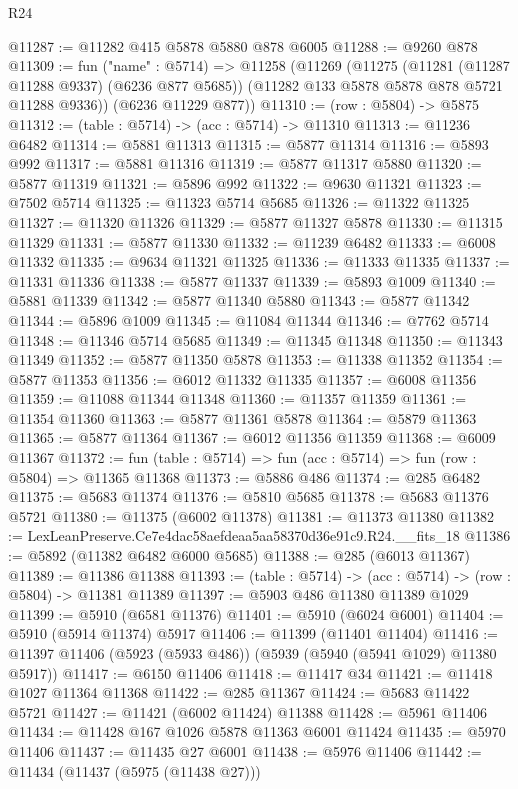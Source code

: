 \begin{lexlean}{R24}
\begin{coremodule}
@11287 := @11282 @415 @5878 @5880 @878 @6005
@11288 := @9260 @878
@11309 := fun ("name" : @5714) =>
  @11258
    (@11269
      (@11275
        (@11281 (@11287 @11288 @9337) (@6236 @877 @5685))
        (@11282 @133 @5878 @5878 @878 @5721 @11288 @9336))
      (@6236 @11229 @877))
@11310 := (row : @5804) -> @5875
@11312 := (table : @5714) -> (acc : @5714) -> @11310
@11313 := @11236 @6482
@11314 := @5881 @11313
@11315 := @5877 @11314
@11316 := @5893 @992
@11317 := @5881 @11316
@11319 := @5877 @11317 @5880
@11320 := @5877 @11319
@11321 := @5896 @992
@11322 := @9630 @11321
@11323 := @7502 @5714
@11325 := @11323 @5714 @5685
@11326 := @11322 @11325
@11327 := @11320 @11326
@11329 := @5877 @11327 @5878
@11330 := @11315 @11329
@11331 := @5877 @11330
@11332 := @11239 @6482
@11333 := @6008 @11332
@11335 := @9634 @11321 @11325
@11336 := @11333 @11335
@11337 := @11331 @11336
@11338 := @5877 @11337
@11339 := @5893 @1009
@11340 := @5881 @11339
@11342 := @5877 @11340 @5880
@11343 := @5877 @11342
@11344 := @5896 @1009
@11345 := @11084 @11344
@11346 := @7762 @5714
@11348 := @11346 @5714 @5685
@11349 := @11345 @11348
@11350 := @11343 @11349
@11352 := @5877 @11350 @5878
@11353 := @11338 @11352
@11354 := @5877 @11353
@11356 := @6012 @11332 @11335
@11357 := @6008 @11356
@11359 := @11088 @11344 @11348
@11360 := @11357 @11359
@11361 := @11354 @11360
@11363 := @5877 @11361 @5878
@11364 := @5879 @11363
@11365 := @5877 @11364
@11367 := @6012 @11356 @11359
@11368 := @6009 @11367
@11372 := fun (table : @5714) => fun (acc : @5714) => fun (row : @5804) => @11365 @11368
@11373 := @5886 @486
@11374 := @285 @6482
@11375 := @5683 @11374
@11376 := @5810 @5685
@11378 := @5683 @11376 @5721
@11380 := @11375 (@6002 @11378)
@11381 := @11373 @11380
@11382 := LexLeanPreserve.Ce7e4dac58aefdeaa5aa58370d36e91c9.R24.__fits_18
@11386 := @5892 (@11382 @6482 @6000 @5685)
@11388 := @285 (@6013 @11367)
@11389 := @11386 @11388
@11393 := (table : @5714) -> (acc : @5714) -> (row : @5804) -> @11381 @11389
@11397 := @5903 @486 @11380 @11389 @1029
@11399 := @5910 (@6581 @11376)
@11401 := @5910 (@6024 @6001)
@11404 := @5910 (@5914 @11374) @5917
@11406 := @11399 (@11401 @11404)
@11416 := @11397 @11406 (@5923 (@5933 @486)) (@5939 (@5940 (@5941 @1029) @11380 @5917))
@11417 := @6150 @11406
@11418 := @11417 @34
@11421 := @11418 @1027 @11364 @11368
@11422 := @285 @11367
@11424 := @5683 @11422 @5721
@11427 := @11421 (@6002 @11424) @11388
@11428 := @5961 @11406
@11434 := @11428 @167 @1026 @5878 @11363 @6001 @11424
@11435 := @5970 @11406
@11437 := @11435 @27 @6001
@11438 := @5976 @11406
@11442 := @11434 (@11437 (@5975 (@11438 @27)))

\end{coremodule}
\end{lexlean}
